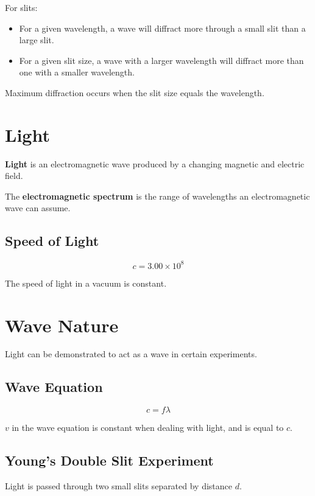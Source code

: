 \documentclass[a4paper,11pt]{report}
\begin{document}
For slits:

\begin{itemize}
\item For a given wavelength, a wave will diffract more through a small slit
	than a large slit.
\item For a given slit size, a wave with a larger wavelength will diffract more
	than one with a smaller wavelength.
\end{itemize}

Maximum diffraction occurs when the slit size equals the wavelength.


\section{Light}

\textbf{Light} is an electromagnetic wave produced by a changing magnetic and
electric field.

The \textbf{electromagnetic spectrum} is the range of wavelengths an
electromagnetic wave can assume.

\subsection{Speed of Light}

$$
c = 3.00 \times 10^8
$$

The speed of light in a vacuum is constant.


\section{Wave Nature}

Light can be demonstrated to act as a wave in certain experiments.

\subsection{Wave Equation}

$$
c = f \lambda
$$

$v$ in the wave equation is constant when dealing with light, and is equal to
$c$.

\subsection{Young's Double Slit Experiment}


Light is passed through two small slits separated by distance $d$.
\end{document}
